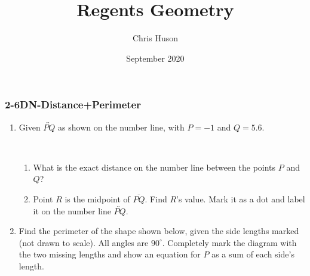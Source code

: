 \documentclass[12pt, twoside]{article}
\title{Regents Geometry}
\author{Chris Huson}
\date{September 2020}
\begin{document}
\subsubsection*{2-6DN-Distance+Perimeter}
\begin{enumerate}
\item Given $\overleftrightarrow{PQ}$ as shown on the number line, with $P=-1$ and $Q=5.6$. \\[20pt] %
     \\ \smallskip
    \begin{enumerate}
      \item What is the exact distance on the number line between the points $P$ and $Q$?  \vspace{2cm}
      \item Point $R$ is the midpoint of $\overline{PQ}$. Find $R$'s value. Mark it as a dot and label it on the number line $\overleftrightarrow{PQ}$.
    \end{enumerate}  \vspace{4cm}  

\item Find the perimeter of the shape shown below, given the side lengths marked (not drawn to scale). All angles are $90^\circ$. Completely mark the diagram with the two missing lengths and show an equation for $P$ as a sum of each side's length.
    \vspace{1cm} 
    \begin{flushleft}
    \end{flushleft} \vspace{1cm}  


\end{enumerate}
\end{document}

